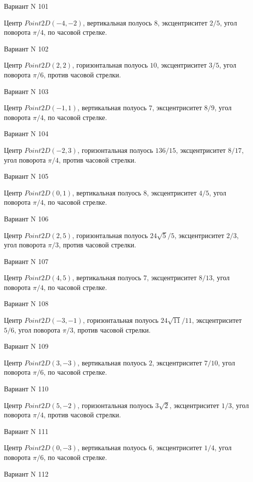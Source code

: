 \documentclass[11pt]{report}
\begin{document}
Вариант N 101

Центр $Point2D\left(-4, -2\right)$, вертикальная полуось $8$, эксцентриситет $2 / 5$, угол поворота $\pi / 4$, по часовой стрелке.

Вариант N 102

Центр $Point2D\left(2, 2\right)$, горизонтальная полуось $10$, эксцентриситет $3 / 5$, угол поворота $\pi / 6$, против часовой стрелки.

Вариант N 103

Центр $Point2D\left(-1, 1\right)$, вертикальная полуось $7$, эксцентриситет $8 / 9$, угол поворота $\pi / 4$, по часовой стрелке.

Вариант N 104

Центр $Point2D\left(-2, 3\right)$, горизонтальная полуось $136 / 15$, эксцентриситет $8 / 17$, угол поворота $\pi / 4$, против часовой стрелки.

Вариант N 105

Центр $Point2D\left(0, 1\right)$, вертикальная полуось $8$, эксцентриситет $4 / 5$, угол поворота $\pi / 4$, по часовой стрелке.

Вариант N 106

Центр $Point2D\left(2, 5\right)$, горизонтальная полуось $24 \sqrt{5} / 5$, эксцентриситет $2 / 3$, угол поворота $\pi / 3$, против часовой стрелки.

Вариант N 107

Центр $Point2D\left(4, 5\right)$, вертикальная полуось $7$, эксцентриситет $8 / 13$, угол поворота $\pi / 4$, по часовой стрелке.

Вариант N 108

Центр $Point2D\left(-3, -1\right)$, горизонтальная полуось $24 \sqrt{11} / 11$, эксцентриситет $5 / 6$, угол поворота $\pi / 3$, против часовой стрелки.

Вариант N 109

Центр $Point2D\left(3, -3\right)$, вертикальная полуось $2$, эксцентриситет $7 / 10$, угол поворота $\pi / 6$, по часовой стрелке.

Вариант N 110

Центр $Point2D\left(5, -2\right)$, горизонтальная полуось $3 \sqrt{2}$, эксцентриситет $1 / 3$, угол поворота $\pi / 4$, против часовой стрелки.

Вариант N 111

Центр $Point2D\left(0, -3\right)$, вертикальная полуось $6$, эксцентриситет $1 / 4$, угол поворота $\pi / 6$, по часовой стрелке.

Вариант N 112
\end{document}
